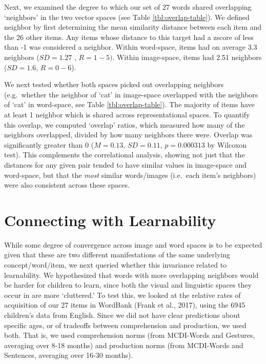 \documentclass[10pt, letterpaper]{article}
\begin{document}
Next, we examined the degree to which our set of 27 words shared
overlapping `neighbors' in the two vector spaces (see Table
\ref{tbl:overlap-table}). We defined neighbor by first determining the
mean similarity distance between each item and the 26 other items. Any
items whose distance to this target had a zscore of less than -1 was
considered a neighbor. Within word-space, items had on average 3.3
neighbors (\(SD=1.27\) , \(R=1-5)\). Within image-space, items had 2.51
neighbors (\(SD=1.6\), \(R=0-6\)).

We next tested whether both spaces picked out overlapping neighbors
(e.g.~whether the neighbor of `cat' in image-space overlapped with the
neighbors of `cat' in word-space, see Table \ref{tbl:overlap-table}).
The majority of items have at least 1 neighbor which is shared across
representational spaces. To quantify this overlap, we computed `overlap'
ratios, which measured how many of the neighbors overlapped, divided by
how many neighbors there were. Overlap was significantly greater than 0
(\(M=0.13\), \(SD=0.11\), \(p=0.000313\) by Wilcoxon test). This
complements the correlational analysis, showing not just that the
distances for any given pair tended to have similar values in
image-space and word-space, but that the \emph{most} similar
words/images (i.e.~each item's neighbors) were also consistent across
these spaces.

\section{Connecting with
Learnability}\label{connecting-with-learnability}

While some degree of convergence across image and word spaces is to be
expected given that these are two different manifestations of the same
underlying concept/word/item, we next queried whether this invariance
related to learnability. We hypothesized that words with more
overlapping neighbors would be harder for children to learn, since both
the visual and linguistic spaces they occur in are more `cluttered.' To
test this, we looked at the relative rates of acquisition of our 27
items in WordBank (Frank et al., 2017), using the 6945 children's data
from English. Since we did not have clear predictions about specific
ages, or of tradeoffs between comprehension and production, we used
both. That is, we used comprehension norms (from MCDI-Words and
Gestures, averaging over 8-18 months) and production norms (from
MCDI-Words and Sentences, averaging over 16-30 months).
\end{document}
